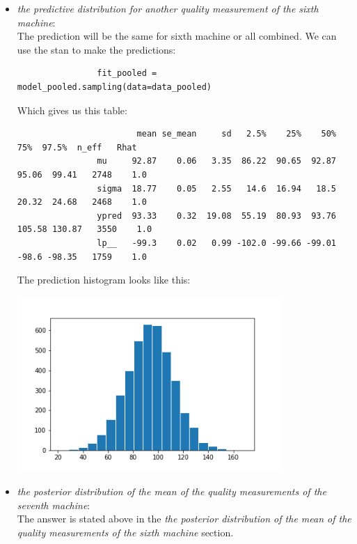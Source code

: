 \documentclass[11pt,a4paper,english]{article}
\begin{document}
\begin{itemize}
            \item \textit{the predictive distribution for another quality measurement of the sixth machine}: \\
              The prediction will be the same for sixth machine or all combined. We can use the stan to make the predictions:
              \begin{verbatim}
                fit_pooled = model_pooled.sampling(data=data_pooled)
              \end{verbatim}
              Which gives us this table:
              \begin{verbatim}
                        mean se_mean     sd   2.5%    25%    50%    75%  97.5%  n_eff   Rhat
                mu     92.87    0.06   3.35  86.22  90.65  92.87  95.06  99.41   2748    1.0
                sigma  18.77    0.05   2.55   14.6  16.94   18.5  20.32  24.68   2468    1.0
                ypred  93.33    0.32  19.08  55.19  80.93  93.76 105.58 130.87   3550    1.0
                lp__   -99.3    0.02   0.99 -102.0 -99.66 -99.01  -98.6 -98.35   1759    1.0
              \end{verbatim}
              The prediction histogram looks like this:
              \begin{center}
                \includegraphics[width=10cm]{pooled_hist.png}
              \end{center}
            \item \textit{the posterior distribution of the mean of the quality measurements of the seventh machine}: \\
              The answer is stated above in the \textit{the posterior distribution of the mean of the quality measurements of the sixth machine} section.
          \end{itemize}
\end{document}
